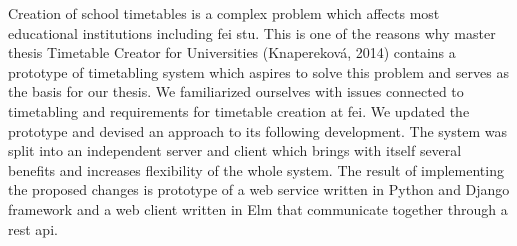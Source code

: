 Creation of school timetables is a complex problem which affects most
educational institutions including \acrshort{fei} \acrshort{stu}. This is one of
the reasons why master thesis Timetable Creator for Universities (Knapereková,
2014) contains a prototype of timetabling system which aspires to solve this
problem and serves as the basis for our thesis. We familiarized ourselves with
issues connected to timetabling and requirements for timetable creation at
\acrshort{fei}. We updated the prototype and devised an approach to its
following development. The system was split into an independent server and
client which brings with itself several benefits and increases flexibility of
the whole system. The result of implementing the proposed changes is prototype
of a web service written in Python and Django framework and a web client written
in Elm that communicate together through a \acrshort{rest} \acrshort{api}.
